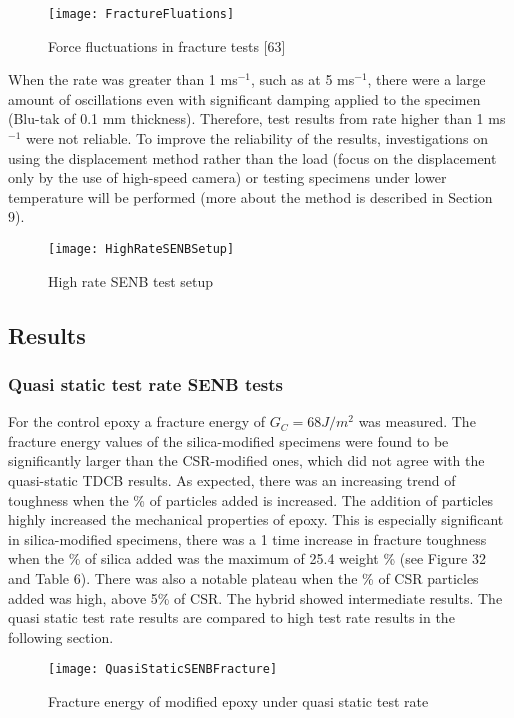 \documentclass[numbers=noendperiod,chapterprefix=on]{icldt} %
\begin{document}
\begin{figure}[!htpb]
\centering
\texttt{[image: FractureFluations]}
\caption{Force fluctuations in fracture tests [63]} %
\end{figure}

When the rate was greater than 1 ms$^{-1}$, such as at 5 ms$^{-1}$, there were a large amount of oscillations even with significant damping applied to the specimen (Blu-tak of 0.1 mm thickness). Therefore, test results from rate higher than 1 ms$^{-1}$ were not reliable. To improve the reliability of the results, investigations on using the displacement method rather than the load (focus on the displacement only by the use of high-speed camera) or testing specimens under lower temperature will be performed (more about the method is described in Section 9). 

\begin{figure}[!htpb]
\centering
\texttt{[image: HighRateSENBSetup]}
\caption{High rate SENB test setup } %
\end{figure}

\subsection{Results}
\subsubsection{Quasi static test rate SENB tests}
For the control epoxy a fracture energy of $G_C = 68 J/m^2$ was measured. The fracture energy values of the silica-modified specimens were found to be significantly larger than the CSR-modified ones, which did not agree with the quasi-static TDCB results. As expected, there was an increasing trend of toughness when the \% of particles added is increased. The addition of particles highly increased the mechanical properties of epoxy. This is especially significant in silica-modified specimens, there was a 1 time increase in fracture toughness when the \% of silica added was the maximum of 25.4 weight \% (see Figure 32 and Table 6). There was also a notable plateau when the \% of CSR particles added was high, above 5\% of CSR. The hybrid showed intermediate results. 
The quasi static test rate results are compared to high test rate results in the following section. 

\begin{figure}[!hp]
\centering
\texttt{[image: QuasiStaticSENBFracture]}
\caption{Fracture energy of modified epoxy under quasi static test rate} %
\end{figure}
\end{document}
